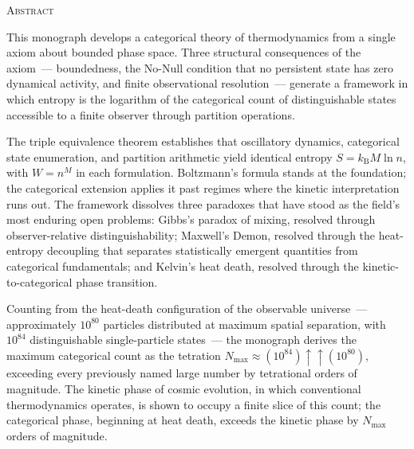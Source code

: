 
\cleardoublepage
\thispagestyle{plain}

\begin{center}
  {\Large\scshape Abstract}
\end{center}

\vspace{1.5em}

\noindent
This monograph develops a categorical theory of thermodynamics from a single axiom
about bounded phase space. Three structural consequences of the axiom~---
boundedness, the No-Null condition that no persistent state has zero dynamical
activity, and finite observational resolution~--- generate a framework in which
entropy is the logarithm of the categorical count of distinguishable states accessible
to a finite observer through partition operations.

\medskip

The triple equivalence theorem establishes that oscillatory dynamics, categorical
state enumeration, and partition arithmetic yield identical entropy
$S = k_{\mathrm{B}} M \ln n$, with $W = n^M$ in each formulation.
Boltzmann's formula stands at the foundation; the categorical extension applies it
past regimes where the kinetic interpretation runs out. The framework dissolves
three paradoxes that have stood as the field's most enduring open problems:
Gibbs's paradox of mixing, resolved through observer-relative distinguishability;
Maxwell's Demon, resolved through the heat-entropy decoupling that separates
statistically emergent quantities from categorical fundamentals; and Kelvin's heat
death, resolved through the kinetic-to-categorical phase transition.

\medskip

Counting from the heat-death configuration of the observable universe~---
approximately $10^{80}$ particles distributed at maximum spatial separation, with
$10^{84}$ distinguishable single-particle states~--- the monograph derives the
maximum categorical count as the tetration
$N_{\max} \approx (10^{84})\uparrow\uparrow(10^{80})$, exceeding every previously
named large number by tetrational orders of magnitude. The kinetic phase of cosmic
evolution, in which conventional thermodynamics operates, is shown to occupy a finite
slice of this count; the categorical phase, beginning at heat death, exceeds the
kinetic phase by $N_{\max}$ orders of magnitude.

